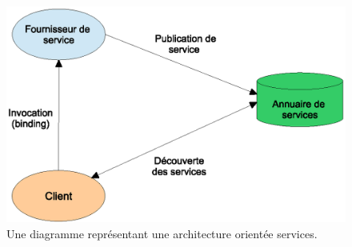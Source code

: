 \begin{figure}[h]
    \centering
    \includegraphics[width=1\textwidth]{figs/ws-basic-arch.eps}
    \caption{Une diagramme représentant une architecture orientée
      services.}
    \label{fig:ws-basic-arch}
\end{figure}

